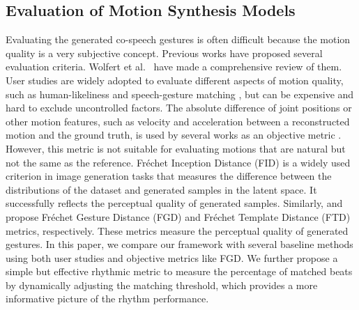 \subsection{Evaluation of Motion Synthesis Models}
Evaluating the generated co-speech gestures is often difficult because the motion quality is a very subjective concept. Previous works have proposed several evaluation criteria. Wolfert et al.~ have made a comprehensive review of them. User studies are widely adopted to evaluate different aspects of motion quality, such as human-likeliness and speech-gesture matching \cite{alexanderson2020style, yoon2020speech, kucherenko2020gesticulator}, but can be expensive and hard to exclude uncontrolled factors. The absolute difference of joint positions or other motion features, such as velocity and acceleration between a reconstructed motion and the ground truth, is used by several works as an objective metric \cite{ginosar2019learning, joo2019towards, kucherenko2019analyzing}. However, this metric is not suitable for evaluating motions that are natural but not the same as the reference. Fr{\'e}chet Inception Distance (FID) \cite{heusel2017gans} is a widely used criterion in image generation tasks that measures the difference between the distributions of the dataset and generated samples in the latent space. It successfully reflects the perceptual quality of generated samples. Similarly, \citet{yoon2020speech} and \citet{qian2021speech} propose Fr{\'e}chet Gesture Distance (FGD) and Fr{\'e}chet Template Distance (FTD) metrics, respectively. These metrics measure the perceptual quality of generated gestures. In this paper, we compare our framework with several baseline methods using both user studies and objective metrics like FGD. We further propose a simple but effective rhythmic metric to measure the percentage of matched beats by dynamically adjusting the matching threshold, which provides a more informative picture of the rhythm performance.